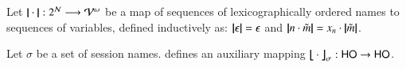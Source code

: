 \smallskip 

\begin{definition}\rm 
\label{def:hop_to_ho}
	Let $|\!|\cdot|\!|: 2^{\mathcal{N}} \longrightarrow \mathcal{V}^\omega$
	be a map of sequences of 
lexicographically ordered names to sequences of variables, defined
	inductively as: 
	$|\!|\epsilon|\!| = \epsilon$ and $|\!|n \cdot \tilde{m}|\!| = x_n \cdot |\!|\tilde{m}|\!|$. 
\end{definition}

\smallskip 

%

\begin{definition} \label{d:trabs}\label{d:auxmap}
	Let $\sigma$ be a set of session names.
	 defines an auxiliary mapping
	$\big\lfloor\!\!\big\lfloor\cdot\big\rfloor\!\!\big\rfloor^{}_\sigma: \mathsf{HO} \to \mathsf{HO}$.
\end{definition}

